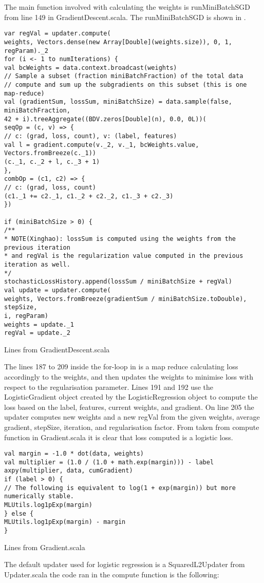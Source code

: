 The main function involved with calculating the weights is runMiniBatchSGD from line 149 in GradientDescent.scala. The runMiniBatchSGD is shown in . 

\begin{listing}[H]
\begin{verbatim}
var regVal = updater.compute(
weights, Vectors.dense(new Array[Double](weights.size)), 0, 1, regParam)._2
for (i <- 1 to numIterations) {
val bcWeights = data.context.broadcast(weights)
// Sample a subset (fraction miniBatchFraction) of the total data
// compute and sum up the subgradients on this subset (this is one map-reduce)
val (gradientSum, lossSum, miniBatchSize) = data.sample(false, miniBatchFraction,
42 + i).treeAggregate((BDV.zeros[Double](n), 0.0, 0L))(
seqOp = (c, v) => {
// c: (grad, loss, count), v: (label, features)
val l = gradient.compute(v._2, v._1, bcWeights.value, Vectors.fromBreeze(c._1))
(c._1, c._2 + l, c._3 + 1)
},
combOp = (c1, c2) => {
// c: (grad, loss, count)
(c1._1 += c2._1, c1._2 + c2._2, c1._3 + c2._3)
})

if (miniBatchSize > 0) {
/**
* NOTE(Xinghao): lossSum is computed using the weights from the previous iteration
* and regVal is the regularization value computed in the previous iteration as well.
*/
stochasticLossHistory.append(lossSum / miniBatchSize + regVal)
val update = updater.compute(
weights, Vectors.fromBreeze(gradientSum / miniBatchSize.toDouble), stepSize,
i, regParam)
weights = update._1
regVal = update._2
\end{verbatim}
\caption{Lines from GradientDescent.scala}
\label{lst:runMiniBatchSGD}
\end{listing}
The lines 187 to 209 inside the for-loop in  is a map reduce calculating loss accordingly to the weights, and then updates the weights to minimise loss with respect to the regularisation parameter. Lines 191 and 192 use the LogisticGradient object created by the LogisticRegression object to compute the loss based on the label, features, current weights, and gradient. On line 205 the updater computes new weights and a new regVal from the given weights, average gradient, stepSize, iteration, and regularisation factor.
From  taken from compute function in Gradient.scala it is clear that loss computed is a logistic loss.  
\begin{listing}[H]
\begin{verbatim}
val margin = -1.0 * dot(data, weights)
val multiplier = (1.0 / (1.0 + math.exp(margin))) - label
axpy(multiplier, data, cumGradient)
if (label > 0) {
// The following is equivalent to log(1 + exp(margin)) but more numerically stable.
MLUtils.log1pExp(margin)
} else {
MLUtils.log1pExp(margin) - margin
}
\end{verbatim}
\caption{Lines from Gradient.scala}
\label{lst:sparkloss}
\end{listing}
The default updater used for logistic regression is a SquaredL2Updater from Updater.scala
the code ran in the compute function is the following:

